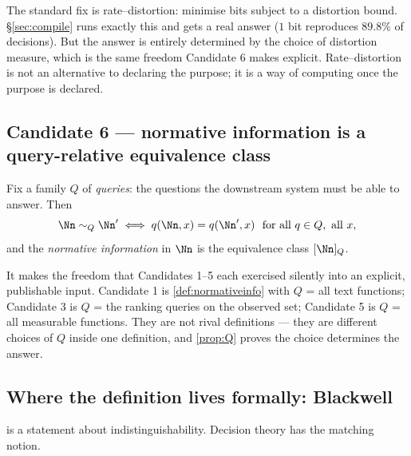 \begin{remark}
The standard fix is rate--distortion: minimise bits subject to a distortion
bound. §\ref{sec:compile} runs exactly this and gets a real answer ($1$ bit
reproduces $89.8\%$ of decisions). But the answer is entirely determined by the
choice of distortion measure, which is the same freedom Candidate 6 makes
explicit. Rate--distortion is not an alternative to declaring the purpose; it is
a way of computing once the purpose is declared.
\end{remark}

\subsection{Candidate 6 --- normative information is a query-relative equivalence class}

\begin{definition}
\label{def:normativeinfo}
Fix a family $Q$ of \emph{queries}: the questions the downstream system must be
able to answer. Then
\[
\Nn \sim_Q \Nn' \iff q(\Nn,x)=q(\Nn',x) \ \text{ for all } q\in Q,\ \text{all } x,
\]
and the \emph{normative information} in $\Nn$ is the equivalence class $[\Nn]_Q$.
\end{definition}

 It makes the freedom that Candidates 1--5 each
exercised silently into an explicit, publishable input. Candidate 1 is
\cref{def:normativeinfo} with $Q$ = all text functions; Candidate 3 is $Q$ = the
ranking queries on the observed set; Candidate 5 is $Q$ = all measurable
functions. They are not rival definitions --- they are different choices of $Q$
inside one definition, and \cref{prop:Q} proves the choice determines the answer.


\subsection{Where the definition lives formally: Blackwell}

 is a statement about indistinguishability. Decision
theory has the matching notion.

